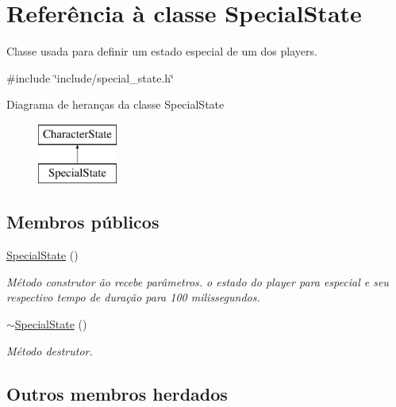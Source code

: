 \hypertarget{classSpecialState}{}\section{Referência à classe Special\+State}
\label{classSpecialState}


Classe usada para definir um estado especial de um dos players.  




{\ttfamily \#include \char`\"{}include/special\+\_\+state.\+h\char`\"{}}

Diagrama de heranças da classe Special\+State\begin{figure}[H]
\begin{center}
\leavevmode
\includegraphics[height=2.000000cm]{classSpecialState}
\end{center}
\end{figure}
\subsection*{Membros públicos}
\begin{DoxyCompactItemize}
\item 
\mbox{\label{classSpecialState_a3e58b79a851109f03f647b32fc94aa10}} 
\mbox{\hyperlink{classSpecialState_a3e58b79a851109f03f647b32fc94aa10}{Special\+State}} ()
\begin{DoxyCompactList}\small\item\em Método construtor ão recebe parâmetros.  o estado do player para especial e seu respectivo tempo de duração para 100 milissegundos. \end{DoxyCompactList}\item 
\mbox{\label{classSpecialState_abc792db1d54f946ae170fa6c0d14e8e3}} 
\mbox{\hyperlink{classSpecialState_abc792db1d54f946ae170fa6c0d14e8e3}{$\sim$\+Special\+State}} ()
\begin{DoxyCompactList}\small\item\em Método destrutor. \end{DoxyCompactList}\end{DoxyCompactItemize}
\subsection*{Outros membros herdados}


